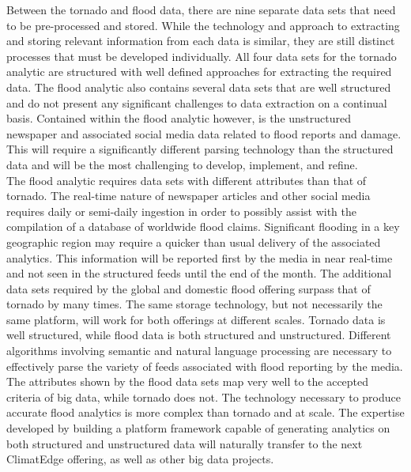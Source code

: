 Between the tornado and flood data, there are nine separate data sets that need to be pre-processed and stored. While the technology and approach to extracting and storing relevant information from each data is similar, they are still distinct processes that must be developed individually. All four data sets for the tornado analytic are structured with well defined approaches for extracting the required data. The flood analytic also contains several data sets that are well structured and do not present any significant challenges to data extraction on a continual basis. Contained within the flood analytic however, is the unstructured newspaper and associated social media data related to flood reports and damage. This will require a significantly different parsing technology than the structured data and will be the most challenging to develop, implement, and refine.\\

The flood analytic requires data sets with different attributes than that of tornado. The real-time nature of newspaper articles and other social media requires daily or semi-daily ingestion in order to possibly assist with the compilation of a database of worldwide flood claims. Significant flooding in a key geographic region may require a quicker than usual delivery of the associated analytics. This information will be reported first by the media in near real-time and not seen in the structured feeds until the end of the month. The additional data sets required by the global and domestic flood offering surpass that of tornado by many times. The same storage technology, but not necessarily the same platform, will work for both offerings at different scales. Tornado data is well structured, while flood data is both structured and unstructured. Different algorithms involving semantic and natural language processing are necessary to effectively parse the variety of feeds associated with flood reporting by the media.  The attributes shown by the flood data sets map very well to the accepted criteria of big data, while tornado does not. The technology necessary to produce accurate flood analytics is more complex than tornado and at scale. The expertise developed by building a platform framework capable of generating analytics on both structured and unstructured data will naturally transfer to the next ClimatEdge offering, as well as other big data projects.